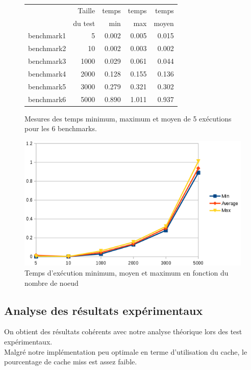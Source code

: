 \documentclass[a4paper, 10pt, french]{article}
\begin{document}
	\begin{figure}[!h]
		\begin{center}
			\begin{tabular}{|l||r||r|r|r||}
				\hline
				\hline
				& Taille         & temps     & temps   & temps \\
				& du test     & min       & max     & moyen \\
				\hline
				\hline
				benchmark1 & 5   & 0.002     & 0.005   & 0.015 \\
				\hline
				benchmark2 & 10  & 0.002     & 0.003   & 0.002 \\
				\hline
				benchmark3 & 1000  & 0.029     & 0.061   & 0.044 \\
				\hline
				benchmark4 & 2000  & 0.128    & 0.155    & 0.136 \\
				\hline
				benchmark5 & 3000  & 0.279    & 0.321    & 0.302 \\
				\hline
				benchmark6 & 5000  & 0.890    & 1.011    & 0.937 \\
				\hline
				\hline
			\end{tabular}
			\caption{Mesures des temps minimum, maximum et moyen de 5 exécutions pour les 6 benchmarks.}
			\label{table-temps}

			\vspace{2cm}
			\includegraphics[scale=0.6]{rapport/avg_comp_iter_graph.png}
			\caption{Temps d'exécution minimum, moyen et maximum en fonction du nombre de noeud}
		\end{center}
	\end{figure}

\subsection{Analyse des résultats expérimentaux}
{ On obtient des résultats cohérents avec notre analyse théorique lors des test expérimentaux.\\
  Malgré notre implémentation peu optimale en terme d'utilisation du cache, le pourcentage de cache miss est assez faible.
}
\end{document}

